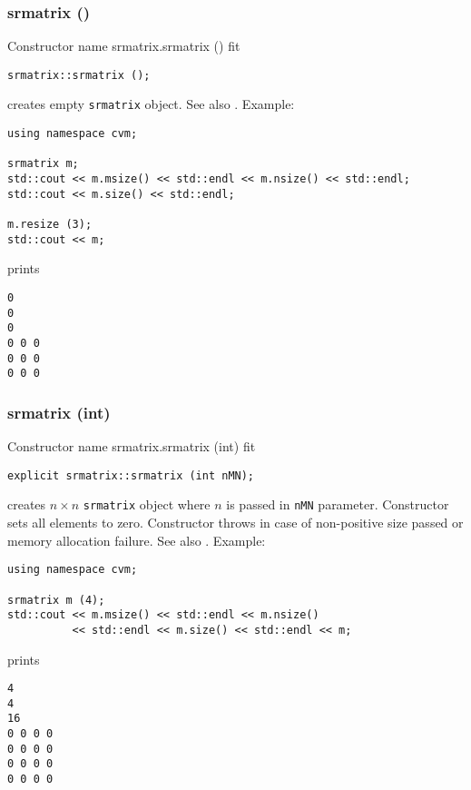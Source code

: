 \subsubsection{srmatrix ()}
Constructor%
\pdfdest name {srmatrix.srmatrix ()} fit
\begin{verbatim}
srmatrix::srmatrix ();
\end{verbatim}
creates  empty \verb"srmatrix" object.
See also .
Example:
\begin{Verbatim}
using namespace cvm;

srmatrix m;
std::cout << m.msize() << std::endl << m.nsize() << std::endl;
std::cout << m.size() << std::endl;

m.resize (3);
std::cout << m;
\end{Verbatim}
prints
\begin{Verbatim}
0
0
0
0 0 0
0 0 0
0 0 0
\end{Verbatim}
\newpage



\subsubsection{srmatrix (int)}
Constructor%
\pdfdest name {srmatrix.srmatrix (int)} fit
\begin{verbatim}
explicit srmatrix::srmatrix (int nMN);
\end{verbatim}
creates  $n\times n$ \verb"srmatrix" object where $n$ is passed in
\verb"nMN" parameter. Constructor sets all elements to zero.
Constructor throws  
in case of non-positive size passed or memory allocation failure.
See also .
Example:
\begin{Verbatim}
using namespace cvm;

srmatrix m (4);
std::cout << m.msize() << std::endl << m.nsize() 
          << std::endl << m.size() << std::endl << m;
\end{Verbatim}
prints
\begin{Verbatim}
4
4
16
0 0 0 0
0 0 0 0
0 0 0 0
0 0 0 0
\end{Verbatim}
\newpage



